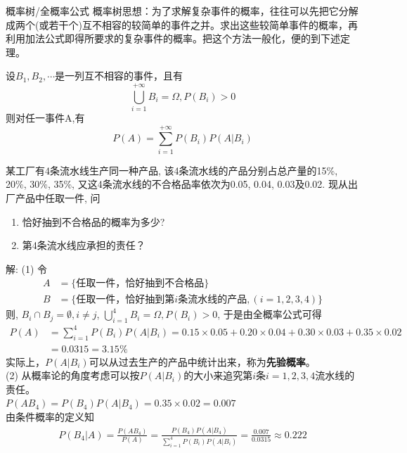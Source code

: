 \begin{frame}{概率树/全概率公式}
概率树思想：为了求解复杂事件的概率，往往可以先把它分解成两个(或若干个)互不相容的较简单的事件之并。求出这些较简单事件的概率，再利用加法公式即得所要求的复杂事件的概率。把这个方法一般化，便的到下述定理。
\begin{theorem}
	设$B_1,B_2,\cdots$是一列互不相容的事件，且有
	\[\bigcup_{i=1}^{+\infty}B_i=\Omega,P(B_i)>0 \]
	则对任一事件A,有
	\[P(A)=\sum_{i=1}^{+\infty}P(B_i)P(A|B_i) \]	
\end{theorem}
\end{frame}

\begin{frame}
\begin{example}
	某工厂有4条流水线生产同一种产品, 该4条流水线的产品分别占总产量的15\%, 20\%, 30\%, 35\%, 又这4条流水线的不合格品率依次为0.05, 0.04, 0.03及0.02. 现从出厂产品中任取一件, 问
	\begin{enumerate}
		\item 恰好抽到不合格品的概率为多少? 
		\item 第4条流水线应承担的责任？
	\end{enumerate} 
\end{example}
\end{frame}

\begin{frame}[shrink]
解: (1) 令
\begin{align*}
A&=\{\text{任取一件，恰好抽到不合格品} \}\\
B&=\{\text{任取一件，恰好抽到第$i$条流水线的产品}, (i=1,2,3,4) \}
\end{align*}
则, $B_i\cap B_j=\emptyset, i\ne j$, $\bigcup\limits_{i=1}^4B_i=\Omega, P(B_i)>0$, 于是由全概率公式可得
\begin{align*}
P(A)&=\sum\limits_{i=1}^4P(B_i)P(A|B_i)=0.15\times 0.05+0.20\times 0.04+0.30\times 0.03+0.35\times 0.02\\
&=0.0315=3.15\%
\end{align*}
实际上，$P(A|B_i)$可以从过去生产的产品中统计出来，称为\textbf{先验概率}。\\
(2) 从概率论的角度考虑可以按$P(A|B_i)$的大小来追究第$i$条$i=1,2,3,4$流水线的责任。\\
$P(AB_4)=P(B_4)P(A|B_4)=0.35\times 0.02=0.007$\\
由条件概率的定义知
\begin{align*}
P(B_4|A)=\frac{P(AB_4)}{P(A)}=\frac{P(B_4)P(A|B_4)}{\sum\limits_{i=1}^4P(B_i)P(A|B_i)}=\frac{0.007}{0.0315}\approx 0.222
\end{align*}
\end{frame}

